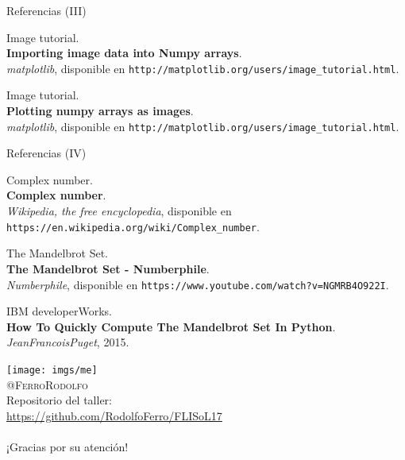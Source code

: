 \documentclass[usenames,dvipsnames]{beamer}
\begin{document}
  \begin{frame}{Referencias (III)}
    \begin{enumerate}[{[}1{]}]
      \addtocounter{enumi}{6}

      \item Image tutorial.\\
      \textbf{Importing image data into Numpy arrays}.\\
      \textit{matplotlib},
      disponible en \texttt{http://matplotlib.org/users/image\_tutorial.html}.

      \item Image tutorial.\\
      \textbf{Plotting numpy arrays as images}.\\
      \textit{matplotlib},
      disponible en \texttt{http://matplotlib.org/users/image\_tutorial.html}.
    \end{enumerate}
  \end{frame}

  \begin{frame}{Referencias (IV)}
    \begin{enumerate}[{[}1{]}]
      \addtocounter{enumi}{8}

      \item Complex number.\\
      \textbf{Complex number}.\\
      \textit{Wikipedia, the free encyclopedia},
      disponible en \texttt{https://en.wikipedia.org/wiki/Complex\_number}.

      \item The Mandelbrot Set.\\
      \textbf{The Mandelbrot Set - Numberphile}.\\
      \textit{Numberphile},
      disponible en \texttt{https://www.youtube.com/watch?v=NGMRB4O922I}.

      \item IBM developerWorks.\\
      \textbf{How To Quickly Compute The Mandelbrot Set In Python}.\\
      \textit{JeanFrancoisPuget}, 2015.
    \end{enumerate}
  \end{frame}

  \begin{frame}[standout]
    \texttt{[image: imgs/me]}\\
    {\color{Turquoise} \textsc{@FerroRodolfo}}\\
    Repositorio del taller:\\
    {\color{orange} \url{https://github.com/RodolfoFerro/FLISoL17}}\\
    \vspace*{0.3cm}
    \noindent {\color{white} \rule{0.3\linewidth}{1mm} }\\
    \vspace*{0.3cm}
    ¡Gracias por su atención!
  \end{frame}
\end{document}
